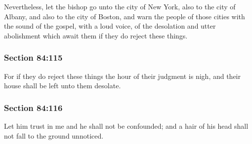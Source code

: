 		Nevertheless, let the bishop go unto the city of New York, also to the city of Albany, and also to the city of Boston, and warn the people of those cities with the sound of the gospel, with a loud voice, of the desolation and utter abolishment which await them if they do reject these things.


	\subsubsection{Section 84:115} %
		\label{DC84-115}

		For if they do reject these things the hour of their judgment is nigh, and their house shall be left unto them desolate.


	\subsubsection{Section 84:116} %
		\label{DC84-116}

		Let him trust in me and he shall not be confounded; and a hair of his head shall not fall to the ground unnoticed.


